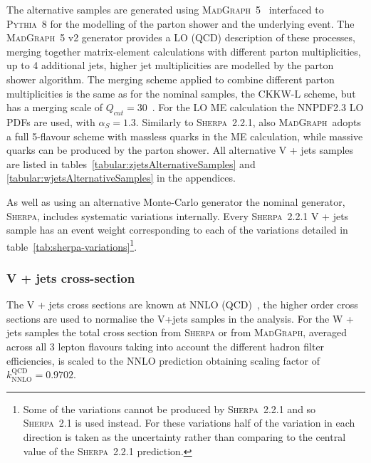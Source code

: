 The alternative samples are generated using
\textsc{MadGraph}~5~\cite{MADGRAPH5_aMC@NLO} interfaced to \textsc{Pythia}~8 for
the modelling of the parton shower and the underlying event. The
\textsc{MadGraph}~5 v2 generator provides a LO (QCD) description of these
processes, merging together matrix-element calculations with different parton
multiplicities, up to 4 additional jets, higher jet multiplicities are modelled
by the parton shower algorithm. The merging scheme applied to combine different
parton multiplicities is the same as for the nominal samples, the CKKW-L scheme,
but has a merging scale of $Q_{cut} = 30$~\GeV. For the LO ME calculation the
NNPDF2.3 LO PDFs are used, with $\alpha_S = 1.3$.  Similarly to
\textsc{Sherpa}~2.2.1, also \textsc{MadGraph}~adopts a full 5-flavour scheme
with massless quarks in the ME calculation, while massive quarks can be produced
by the parton shower. All alternative V + jets samples are listed in
tables~\ref{tabular:zjetsAlternativeSamples} and
\ref{tabular:wjetsAlternativeSamples} in the appendices.

As well as using an alternative Monte-Carlo generator the nominal generator,
\textsc{Sherpa}, includes systematic variations internally. Every
\textsc{Sherpa}~2.2.1 V + jets sample has an event weight corresponding to each
of the variations detailed in table~\ref{tab:sherpa-variations}\footnote{Some of
the variations cannot be produced by \textsc{Sherpa}~2.2.1 and so
\textsc{Sherpa}~2.1 is used instead. For these variations half of the variation
in each direction is taken as the uncertainty rather than comparing to the
central value of the \textsc{Sherpa}~2.2.1 prediction.}.


\subsubsection{V + jets cross-section}
The V + jets cross sections are known at NNLO (QCD)~\cite{Butterworth:1287902},
the higher order cross sections are used to normalise the V+jets samples in the
analysis. For the W + jets samples the total cross section from \textsc{Sherpa} or
from \textsc{MadGraph}, averaged across all 3 lepton flavours taking into account the
different hadron filter efficiencies, is scaled to the NNLO prediction obtaining
scaling factor of $k_{\text{NNLO}}^{\text{QCD}} = 0.9702$.

